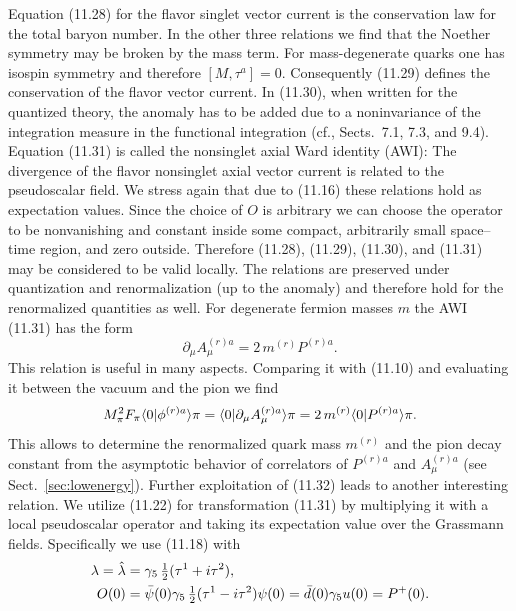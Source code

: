 Equation (11.28) for the flavor singlet vector current is the conservation law for
the total baryon number. In the other three relations we find that the Noether
symmetry may be broken by the mass term. For mass-degenerate quarks one
has isospin symmetry and therefore $[M, \tau^a] = 0$. Consequently (11.29) defines
the conservation of the flavor vector current. In (11.30), when written for the
quantized theory, the anomaly has to be added due to a noninvariance of the
integration measure in the functional integration (cf., Sects.~7.1, 7.3, and 9.4).
Equation (11.31) is called the nonsinglet axial Ward identity (AWI): The
divergence of the flavor nonsinglet axial vector current is related to the pseudoscalar field.
We stress again that due to (11.16) these relations hold as expectation
values. Since the choice of $O$ is arbitrary we can choose the operator to be
nonvanishing and constant inside some compact, arbitrarily small space--time
region, and zero outside. Therefore (11.28), (11.29), (11.30), and (11.31) may
be considered to be valid locally. The relations are preserved under quantization and renormalization (up to the anomaly) and therefore hold for the
renormalized quantities as well.
For degenerate fermion masses $m$ the AWI (11.31) has the form
\begin{equation}
\partial_\mu A_\mu^{(r)a} = 2\,m^{(r)} P^{(r)a} .
\end{equation}
This relation is useful in many aspects. Comparing it with (11.10) and evaluating it between the vacuum and the pion we find
\begin{equation}
M_\pi^2 F_\pi \langle0|\phi^{(r)a}\rangle{\pi}
= \langle0|\partial_\mu A_\mu^{(r)a}\rangle{\pi}
= 2\,m^{(r)} \langle0|P^{(r)a}\rangle{\pi} .
\end{equation}
This allows to determine the renormalized quark mass $m^{(r)}$ and the pion decay
constant from the asymptotic behavior of correlators of $P^{(r)a}$ and $A_\mu^{(r)a}$ (see
Sect.~\ref{sec:lowenergy}).
Further exploitation of (11.32) leads to another interesting relation. We
utilize (11.22) for transformation (11.31) by multiplying it with a local pseudoscalar operator and taking its expectation value over the Grassmann fields.
Specifically we use (11.18) with
\begin{equation}
\begin{aligned}
\lambda = \hat{\lambda} &= \gamma_5\,\tfrac{1}{2}(\tau^1 + i\tau^2) , \\
O(0) &= \bar{\psi}(0)\gamma_5\,\tfrac{1}{2}(\tau^1 - i\tau^2)\psi(0)
= \bar{d}(0)\gamma_5 u(0) = P^+(0) .
\end{aligned}
\end{equation}
